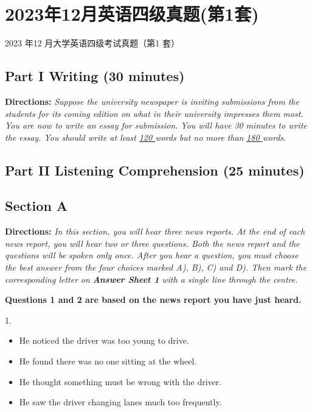 \documentclass[UTF8,11pt]{ctexart}
\begin{document}
\section*{2023年12月英语四级真题(第1套)}
2023 年12 月大学英语四级考试真题（第1 套）


\subsection*{\textbf{Part I Writing} \textbf{(30 minutes)}}


\textbf{Directions:} \textit{Suppose the university newspaper is inviting submissions from the students for its coming edition on} \textit{what in their university impresses them most. You are now to write an essay for submission. You will have 30} \textit{minutes to write the essay. You should write at least }\textit{\uline{120 }}\textit{words but no more than }\textit{\uline{180 }}\textit{words.}


\subsection*{\textbf{Part II} \textbf{Listening Comprehension} \textbf{(25 minutes)}}


\subsection*{\textbf{Section A}}


\textbf{Directions:} \textit{In this section, you will hear three news reports. At the end of each news report, you will hear two or} \textit{three questions. Both the news report and the questions will be spoken only once. After you hear a question, you} \textit{must choose the best answer from the four choices marked A), B), C) and D). Then mark the corresponding letter} \textit{on }\textbf{\textit{Answer Sheet 1}}\textit{ with a single line through the centre.}


\textbf{Questions 1 and 2 are based on the news report you have just heard.}


1.


\begin{itemize}[leftmargin=2em,itemsep=.2em,topsep=.4em]\item[A.] He noticed the driver was too young to drive.
\item[B.] He found there was no one sitting at the wheel.
\item[C.] He thought something must be wrong with the driver.
\item[D.] He saw the driver changing lanes much too frequently.
\end{itemize}
\end{document}
